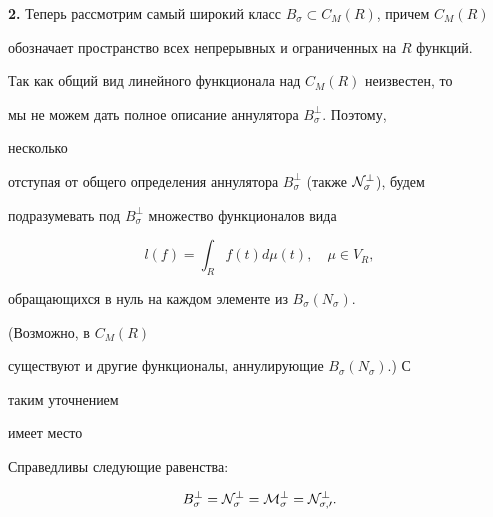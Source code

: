  


{\bf 2.} Теперь рассмотрим самый широкий класс $B_\sigma\subset 


C_M(R)$, причем $C_M(R)$ 


обозначает пространство всех непрерывных и ограниченных на $R$ функций. 


 


Так как общий вид линейного функционала над $C_M(R)$ неизвестен, то 


мы не можем дать полное описание аннулятора $B^\bot_\sigma$. Поэтому, 


несколько 


отступая от общего определения аннулятора $B^\bot_\sigma$ (также $\cal 


N^\bot_\sigma$), будем 


подразумевать под $B^\bot_\sigma$ множество функционалов вида 


$$ 


l(f)=\int_R f(t)d\mu(t),\quad \mu\in V_R, 


$$ 


обращающихся в нуль на каждом элементе из $B_\sigma(N_\sigma)$. 


(Возможно, в $C_M(R)$ 


существуют и другие функционалы, аннулирующие $B_\sigma(N_\sigma)$.) С 


таким уточнением 


имеет место 


 


\begin{thm} 


Справедливы следующие равенства$:$ 


$$ 


B^\bot_\sigma=\cal N^\bot_\sigma=\cal M^\bot_\sigma=\cal 


N^\bot_{\sigma,0}. 


$$ 


\end{thm} 


 



